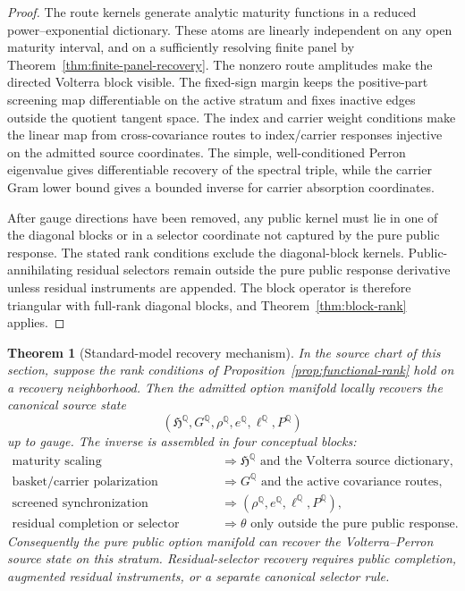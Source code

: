 \documentclass[11pt,a4paper]{amsart}
\theoremstyle{plain}
\newtheorem{theorem}{Theorem}[section]
\theoremstyle{definition}
\theoremstyle{remark}
\newcommand{\QQ}{\mathbb{Q}}
\begin{document}
\begin{proof}
The route kernels generate analytic maturity functions in a reduced power--exponential dictionary.
These atoms are linearly independent on any open maturity interval, and on a sufficiently resolving
finite panel by Theorem~\ref{thm:finite-panel-recovery}.  The nonzero route amplitudes make the
directed Volterra block visible.  The fixed-sign margin keeps the positive-part screening map
differentiable on the active stratum and fixes inactive edges outside the quotient tangent space.
The index and carrier weight conditions make the linear map from cross-covariance routes to
index/carrier responses injective on the admitted source coordinates.  The simple,
well-conditioned Perron eigenvalue gives differentiable recovery of the spectral triple, while the
carrier Gram lower bound gives a bounded inverse for carrier absorption coordinates.

After gauge directions have been removed, any public kernel must lie in one of the diagonal blocks
or in a selector coordinate not captured by the pure public response.  The stated rank conditions
exclude the diagonal-block kernels.  Public-annihilating residual selectors remain outside the pure
public response derivative unless residual instruments are appended.  The block operator is
therefore triangular with full-rank diagonal blocks, and Theorem~\ref{thm:block-rank} applies.
\end{proof}

\begin{theorem}[Standard-model recovery mechanism]\label{thm:standard-model-recovery}
In the source chart of this section, suppose the rank conditions of
Proposition~\ref{prop:functional-rank} hold on a recovery neighborhood.  Then the admitted option
manifold locally recovers the canonical source state
\[
        (\mathfrak{H}^\QQ,G^\QQ,\rho^\QQ,e^\QQ,\ell^\QQ,P^\QQ)
\]
up to gauge.  The inverse is assembled in four conceptual blocks:
\[
\begin{aligned}
        \text{maturity scaling}
        &\Longrightarrow
        \mathfrak{H}^\QQ\text{ and the Volterra source dictionary},\\
        \text{basket/carrier polarization}
        &\Longrightarrow
        G^\QQ\text{ and the active covariance routes},\\
        \text{screened synchronization}
        &\Longrightarrow
        (\rho^\QQ,e^\QQ,\ell^\QQ,P^\QQ),\\
        \text{residual completion or selector choice}
        &\Longrightarrow
        \theta\text{ only outside the pure public response.}
\end{aligned}
\]
Consequently the pure public option manifold can recover the Volterra--Perron source state on this
stratum.  Residual-selector recovery requires public completion, augmented residual instruments, or
a separate canonical selector rule.
\end{theorem}
\end{document}
